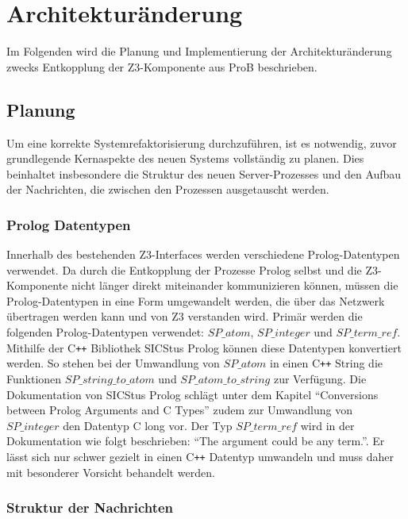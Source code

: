 
\section{Architekturänderung}

Im Folgenden wird die Planung und Implementierung der Architekturänderung zwecks Entkopplung der Z3-Komponente aus ProB beschrieben.

\subsection{Planung}
Um eine korrekte Systemrefaktorisierung durchzuführen, ist es notwendig, zuvor grundlegende Kernaspekte
des neuen Systems vollständig zu planen. Dies beinhaltet insbesondere die Struktur des neuen Server-Prozesses
und den Aufbau der Nachrichten, die zwischen den Prozessen ausgetauscht werden.

\subsubsection{Prolog Datentypen}

Innerhalb des bestehenden Z3-Interfaces werden verschiedene Prolog-Datentypen verwendet.
Da durch die Entkopplung der Prozesse Prolog selbst und die Z3-Komponente nicht länger direkt miteinander kommunizieren können,
müssen die Prolog-Datentypen in eine Form umgewandelt werden, die über das Netzwerk übertragen werden kann und von Z3 verstanden wird.
Primär werden die folgenden Prolog-Datentypen verwendet: $SP\_atom$, $SP\_integer$ und $SP\_term\_ref$.
Mithilfe der C\texttt{++} Bibliothek SICStus Prolog können diese Datentypen konvertiert werden.
So stehen bei der Umwandlung von $SP\_atom$ in einen C\texttt{++} String die Funktionen $SP\_string\_to\_atom$ und $SP\_atom\_to\_string$ zur Verfügung.
Die Dokumentation von SICStus Prolog \cite{sicstusdoc} schlägt unter dem Kapitel \enquote{Conversions between Prolog Arguments and C Types} zudem zur Umwandlung von $SP\_integer$ den Datentyp C long vor.
Der Typ $SP\_term\_ref$ wird in der Dokumentation wie folgt beschrieben: \enquote{The argument could be any term.}.
Er lässt sich nur schwer gezielt in einen C\texttt{++} Datentyp umwandeln und muss daher mit besonderer Vorsicht behandelt werden.

\subsubsection{Struktur der Nachrichten}

